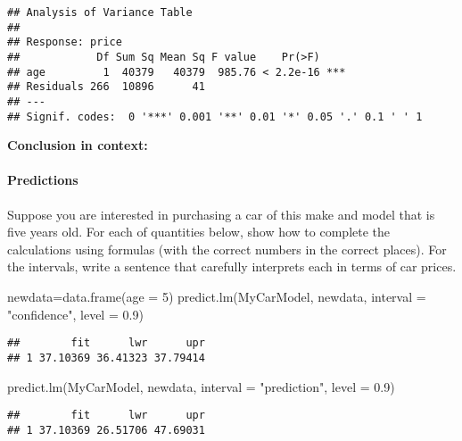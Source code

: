 \documentclass[
]{article}
\newenvironment{Shaded}{\begin{snugshade}}{\end{snugshade}}
\newcommand{\AttributeTok}[1]{\textcolor[rgb]{0.77,0.63,0.00}{#1}}
\newcommand{\DecValTok}[1]{\textcolor[rgb]{0.00,0.00,0.81}{#1}}
\newcommand{\FloatTok}[1]{\textcolor[rgb]{0.00,0.00,0.81}{#1}}
\newcommand{\FunctionTok}[1]{\textcolor[rgb]{0.00,0.00,0.00}{#1}}
\newcommand{\NormalTok}[1]{#1}
\newcommand{\OtherTok}[1]{\textcolor[rgb]{0.56,0.35,0.01}{#1}}
\newcommand{\StringTok}[1]{\textcolor[rgb]{0.31,0.60,0.02}{#1}}
\begin{document}
\begin{verbatim}
## Analysis of Variance Table
## 
## Response: price
##            Df Sum Sq Mean Sq F value    Pr(>F)    
## age         1  40379   40379  985.76 < 2.2e-16 ***
## Residuals 266  10896      41                      
## ---
## Signif. codes:  0 '***' 0.001 '**' 0.01 '*' 0.05 '.' 0.1 ' ' 1
\end{verbatim}

\textbf{Conclusion in context:}

\hypertarget{predictions}{%
\paragraph{Predictions}\label{predictions}}

Suppose you are interested in purchasing a car of this make and model
that is five years old. For each of quantities below, show how to
complete the calculations using formulas (with the correct numbers in
the correct places). For the intervals, write a sentence that carefully
interprets each in terms of car prices.

\begin{Shaded}
\begin{Highlighting}[]
\NormalTok{newdata}\OtherTok{=}\FunctionTok{data.frame}\NormalTok{(}\AttributeTok{age =} \DecValTok{5}\NormalTok{)}
\FunctionTok{predict.lm}\NormalTok{(MyCarModel, newdata, }\AttributeTok{interval =} \StringTok{"confidence"}\NormalTok{, }\AttributeTok{level =} \FloatTok{0.9}\NormalTok{)}
\end{Highlighting}
\end{Shaded}

\begin{verbatim}
##        fit      lwr      upr
## 1 37.10369 36.41323 37.79414
\end{verbatim}

\begin{Shaded}
\begin{Highlighting}[]
\FunctionTok{predict.lm}\NormalTok{(MyCarModel, newdata, }\AttributeTok{interval =} \StringTok{"prediction"}\NormalTok{, }\AttributeTok{level =} \FloatTok{0.9}\NormalTok{)}
\end{Highlighting}
\end{Shaded}

\begin{verbatim}
##        fit      lwr      upr
## 1 37.10369 26.51706 47.69031
\end{verbatim}
\end{document}
